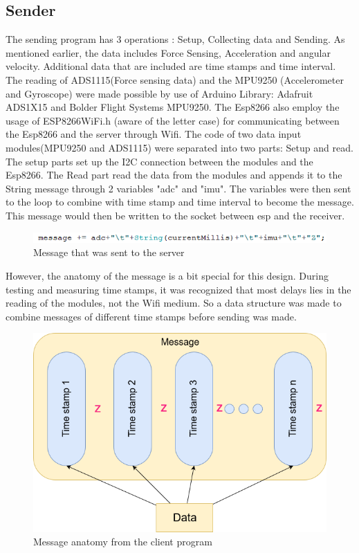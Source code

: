\documentclass[12 pt, a4paper]{thesis}
\begin{document}
\subsection{Sender}
The sending program has 3 operations : Setup, Collecting data and Sending. As mentioned earlier, the data includes Force Sensing, Acceleration and angular velocity. Additional data that are included are time stamps and time interval. The reading of ADS1115(Force sensing data) and the MPU9250 (Accelerometer and Gyroscope) were made possible by use of Arduino Library: Adafruit ADS1X15 and Bolder Flight Systems MPU9250. The Esp8266 also employ the usage of ESP8266WiFi.h (aware of the letter case) for communicating between the Esp8266 and the server through Wifi. The code of two data input modules(MPU9250 and ADS1115) were separated into two parts: Setup and read. The setup parts set up the I2C connection between the modules and the Esp8266. The Read part read the data from the modules and appends it to the String message through 2 variables "adc" and "imu". The variables were then sent to the loop to combine with time stamp and time interval to become the message. This message would then be written to the socket between esp and the receiver.\\
\begin{figure}[hbt!]
\centering
\includegraphics[scale=1]{messagesender}
\caption{Message that was sent to the server}
\end{figure}
However, the anatomy of the message is a bit special for this design. During testing and measuring time stamps, it was recognized that most delays lies in the reading of the modules, not the Wifi medium. So a data structure was made to combine messages of different time stamps before sending was made.\\
\begin{figure}[hbt!]
\centering
\includegraphics[width = 120mm]{message_sender.png}
\caption{Message anatomy from the client program}
\end{figure} 
\end{document}
